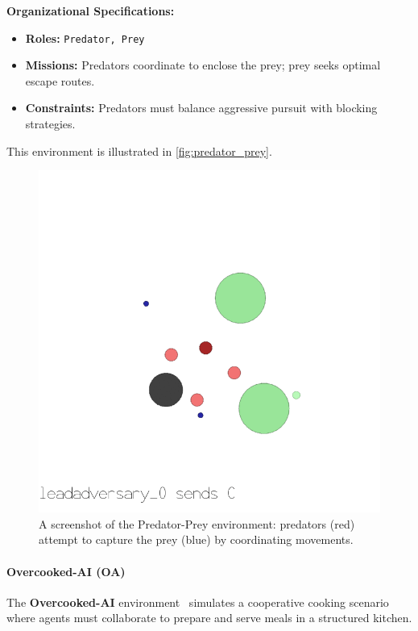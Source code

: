 \documentclass[pdflatex,sn-mathphys-num]{sn-jnl}%
\theoremstyle{thmstyleone}%
\theoremstyle{thmstyletwo}%
\theoremstyle{thmstylethree}%
\begin{document}
\textbf{Organizational Specifications:} 
\begin{itemize}
    \item \textbf{Roles:} \texttt{Predator, Prey}
    \item \textbf{Missions:} Predators coordinate to enclose the prey; prey seeks optimal escape routes.
    \item \textbf{Constraints:} Predators must balance aggressive pursuit with blocking strategies.
\end{itemize}

This environment is illustrated in \autoref{fig:predator_prey}.

\begin{figure}[h!]
    \centering
    \includegraphics[width=0.7\linewidth]{figures/predator_prey.png}
    \caption{A screenshot of the Predator-Prey environment: predators (red) attempt to capture the prey (blue) by coordinating movements.}
    \label{fig:predator_prey}
\end{figure}

\paragraph{Overcooked-AI (OA)}
The \textbf{Overcooked-AI} environment~\cite{carroll2019overcooked} simulates a cooperative cooking scenario where agents must collaborate to prepare and serve meals in a structured kitchen.
\end{document}
